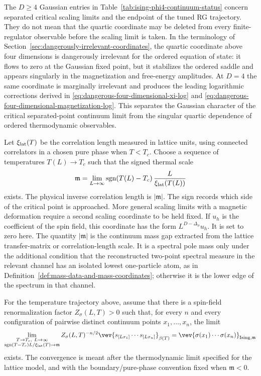 The \(D\geq4\) Gaussian entries in
Table~\ref{tab:ising-phi4-continuum-status} concern separated critical
scaling limits and the endpoint of the tuned RG trajectory.  They do not mean
that the quartic coordinate may be deleted from every finite-regulator
observable before the scaling limit is taken.  In the terminology of
Section~\ref{sec:dangerously-irrelevant-coordinates}, the quartic coordinate
above four dimensions is dangerously irrelevant for the ordered equation of
state: it flows to zero at the Gaussian fixed point, but it stabilizes the
ordered saddle and appears singularly in the magnetization and free-energy
amplitudes.  At \(D=4\) the same coordinate is marginally irrelevant and
produces the leading logarithmic corrections derived in
\eqref{eq:dangerous-four-dimensional-xi-log} and
\eqref{eq:dangerous-four-dimensional-magnetization-log}.  This separates the
Gaussian character of the critical separated-point continuum limit from the
singular quartic dependence of ordered thermodynamic observables.

Let \(\xi_{\rm lat}(T)\) be the correlation length measured in lattice units,
using connected correlators in a chosen pure phase when \(T<T_c\).  Choose a
sequence of temperatures \(T(L)\to T_c\) such that the signed thermal scale
\[
  \mathfrak m
  =
  \lim_{L\to\infty}
  \operatorname{sgn}(T(L)-T_c)\,
  \frac{L}{\xi_{\rm lat}(T(L))}
\]
exists.  The physical inverse correlation length is \(|\mathfrak m|\).  The
sign records which side of the critical point is approached.  More general
scaling limits with a magnetic deformation require a second scaling coordinate
to be held fixed.  If \(u_h\) is the coefficient of the spin field, this
coordinate has the form \(L^{D-\Delta_\sigma}u_h\).  It is set to zero here.
The quantity \(|\mathfrak m|\) is the continuum mass gap extracted from the
lattice transfer-matrix or correlation-length scale.  It is a spectral pole
mass only under the additional condition that the reconstructed two-point
spectral measure in the relevant channel has an isolated lowest one-particle
atom, as in Definition~\ref{def:mass-data-and-mass-coordinates}; otherwise it
is the lower edge of the spectrum in that channel.

\begin{hypothesis}
\label{hyp:ising-separated-spin-scaling-limit}
For the temperature trajectory above, assume that there is a spin-field
renormalization factor \(Z_\sigma(L,T)>0\) such that, for every \(n\) and every
configuration of pairwise distinct continuum points \(x_1,\ldots,x_n\), the
limit
\[
  \lim_{\substack{T\to T_c,\ L\to\infty\\
      \operatorname{sgn}(T-T_c)L/\xi_{\rm lat}(T)\to\mathfrak m}}
  Z_\sigma(L,T)^{-n/2}
  \vev{s_{[Lx_1]}\cdots s_{[Lx_n]}}_{\beta(T)}
  =
  \vev{\sigma(x_1)\cdots\sigma(x_n)}_{\operatorname{Ising},\mathfrak m}
\]
exists.  The convergence is meant after the thermodynamic limit specified for
the lattice model, and with the boundary/pure-phase convention fixed when
\(\mathfrak m<0\).
\end{hypothesis}

